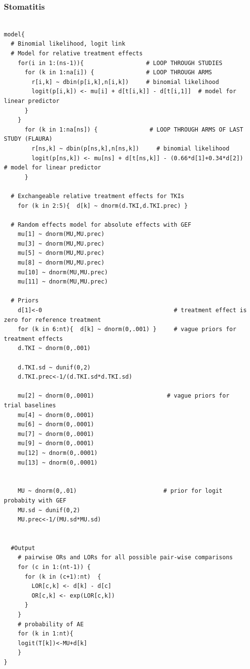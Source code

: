 \documentclass[11pt,final,fleqn]{article}\usepackage[]{graphicx}\usepackage[]{color}
\theoremstyle{plain}
\begin{document}
\begin{appendices}
\begin{verbatim}
\end{verbatim}

\subsubsection{Stomatitis} 
\begin{verbatim} 

model{
  # Binomial likelihood, logit link
  # Model for relative treatment effects
    for(i in 1:(ns-1)){                  # LOOP THROUGH STUDIES
      for (k in 1:na[i]) {               # LOOP THROUGH ARMS
        r[i,k] ~ dbin(p[i,k],n[i,k])     # binomial likelihood
        logit(p[i,k]) <- mu[i] + d[t[i,k]] - d[t[i,1]]  # model for linear predictor
      }
    }   
      for (k in 1:na[ns]) {               # LOOP THROUGH ARMS OF LAST STUDY (FLAURA)
        r[ns,k] ~ dbin(p[ns,k],n[ns,k])     # binomial likelihood
        logit(p[ns,k]) <- mu[ns] + d[t[ns,k]] - (0.66*d[1]+0.34*d[2])  # model for linear predictor
      }
  
  # Exchangeable relative treatment effects for TKIs
    for (k in 2:5){  d[k] ~ dnorm(d.TKI,d.TKI.prec) }
  
  # Random effects model for absolute effects with GEF
    mu[1] ~ dnorm(MU,MU.prec) 
    mu[3] ~ dnorm(MU,MU.prec) 
    mu[5] ~ dnorm(MU,MU.prec) 
    mu[8] ~ dnorm(MU,MU.prec) 
    mu[10] ~ dnorm(MU,MU.prec) 
    mu[11] ~ dnorm(MU,MU.prec)
       
  # Priors
    d[1]<-0                                      # treatment effect is zero for reference treatment
    for (k in 6:nt){  d[k] ~ dnorm(0,.001) }     # vague priors for treatment effects
    d.TKI ~ dnorm(0,.001)
    
    d.TKI.sd ~ dunif(0,2) 
    d.TKI.prec<-1/(d.TKI.sd*d.TKI.sd)
    
    mu[2] ~ dnorm(0,.0001)                     # vague priors for trial baselines
    mu[4] ~ dnorm(0,.0001)                       
    mu[6] ~ dnorm(0,.0001)                       
    mu[7] ~ dnorm(0,.0001)                       
    mu[9] ~ dnorm(0,.0001)
    mu[12] ~ dnorm(0,.0001)
    mu[13] ~ dnorm(0,.0001)

      
    MU ~ dnorm(0,.01)                         # prior for logit probabity with GEF
    MU.sd ~ dunif(0,2) 
    MU.prec<-1/(MU.sd*MU.sd)
    
      
  #Output 
    # pairwise ORs and LORs for all possible pair-wise comparisons                                       
    for (c in 1:(nt-1)) {                        
      for (k in (c+1):nt)  { 
        LOR[c,k] <- d[k] - d[c]
        OR[c,k] <- exp(LOR[c,k])
      }  
    }
    # probability of AE
    for (k in 1:nt){ 
    logit(T[k])<-MU+d[k]
    }
}


\end{verbatim}
\end{appendices}
\end{document}
